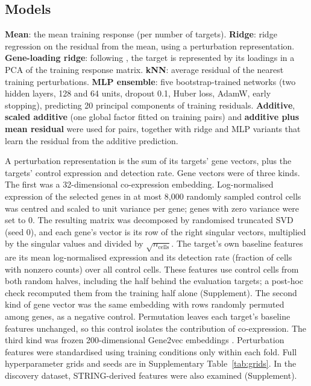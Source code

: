 \subsection{Models}
\textbf{Mean}: the mean training response (per number of targets). \textbf{Ridge}: ridge regression on the residual from the mean, using a perturbation representation. \textbf{Gene-loading ridge}: following \citet{ahlmanneltze2025}, the target is represented by its loadings in a PCA of the training response matrix. \textbf{kNN}: average residual of the nearest training perturbations. \textbf{MLP ensemble}: five bootstrap-trained networks (two hidden layers, 128 and 64 units, dropout 0.1, Huber loss, AdamW, early stopping), predicting 20 principal components of training residuals. \textbf{Additive}, \textbf{scaled additive} (one global factor fitted on training pairs) and \textbf{additive plus mean residual} were used for pairs, together with ridge and MLP variants that learn the residual from the additive prediction.

A perturbation representation is the sum of its targets' gene vectors, plus the targets' control expression and detection rate. Gene vectors were of three kinds. The first was a 32-dimensional co-expression embedding. Log-normalised expression of the selected genes in at most 8{,}000 randomly sampled control cells was centred and scaled to unit variance per gene; genes with zero variance were set to 0. The resulting matrix was decomposed by randomised truncated SVD (seed 0), and each gene's vector is its row of the right singular vectors, multiplied by the singular values and divided by $\sqrt{n_{\text{cells}}}$. The target's own baseline features are its mean log-normalised expression and its detection rate (fraction of cells with nonzero counts) over all control cells. These features use control cells from both random halves, including the half behind the evaluation targets; a post-hoc check recomputed them from the training half alone (Supplement). The second kind of gene vector was the same embedding with rows randomly permuted among genes, as a negative control. Permutation leaves each target's baseline features unchanged, so this control isolates the contribution of co-expression. The third kind was frozen 200-dimensional Gene2vec embeddings \citep{du2019gene2vec}. Perturbation features were standardised using training conditions only within each fold. Full hyperparameter grids and seeds are in Supplementary Table~\ref{tab:grids}. In the discovery dataset, STRING-derived features \citep{szklarczyk2023} were also examined (Supplement).

